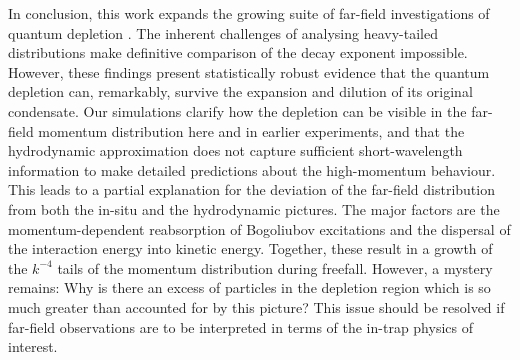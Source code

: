 {	In conclusion, this work expands the growing suite of far-field investigations of quantum depletion \cite{Cayla20,Chang16}.
	The inherent challenges of analysing heavy-tailed distributions make definitive comparison of the decay exponent impossible.
	However, these findings present statistically robust evidence that the quantum depletion can, remarkably, survive the expansion and dilution of its original condensate. 
	Our simulations clarify how the depletion can be visible in the far-field momentum distribution here and in earlier experiments, and that the hydrodynamic approximation does not capture sufficient short-wavelength information to make detailed predictions about the high-momentum behaviour. 
	This leads to a  partial explanation for the deviation of the far-field distribution from both the in-situ and the hydrodynamic pictures. The major factors are the momentum-dependent reabsorption of Bogoliubov excitations and the dispersal of the {interaction energy} into kinetic energy. 
	Together, these result in a growth of the $k^{-4}$ tails of the momentum distribution during freefall. 
	However, a mystery remains: Why is there an excess of particles in the depletion region which is so much greater than accounted for by this picture? 
	This issue should be resolved if far-field observations are to be interpreted in terms of the in-trap physics of interest. 





	

}
